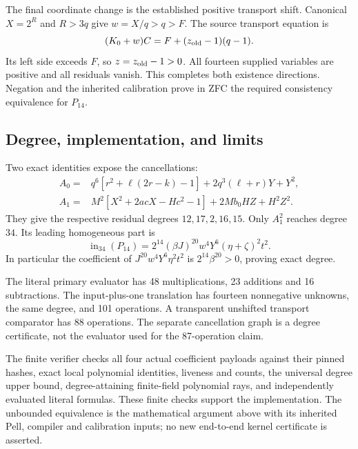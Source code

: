 The final coordinate change is the established positive transport shift.
Canonical $X=2^R$ and $R>3q$ give $w=X/q>q>F$. The source transport
equation is
\[
 (K_0+w)C=F+(z_{\rm old}-1)(q-1).
\]
Its left side exceeds $F$, so $z=z_{\rm old}-1>0$.
All fourteen supplied variables are positive and all residuals vanish.
This completes both existence directions. Negation and the inherited
calibration prove in ZFC the required consistency equivalence for $P_{14}$.

\subsection{Degree, implementation, and limits}

Two exact identities expose the cancellations:
\begin{align*}
 A_0={}&q^6[r^2+\ell(2r-k)-1]+2q^3(\ell+r)Y+Y^2,\\
 A_1={}&M^2[X^2+2acX-Hc^2-1]+2Mb_0HZ+H^2Z^2.
\end{align*}
They give the respective residual degrees $12,17,2,16,15$.
Only $A_1^2$ reaches degree $34$. Its leading homogeneous part is
\[
 \operatorname{in}_{34}(P_{14})
 =2^{14}(\beta J)^{20}w^4Y^6(\eta+\zeta)^2t^2.
\]
In particular the coefficient of $J^{20}w^4Y^6\eta^2t^2$ is
$2^{14}\beta^{20}>0$, proving exact degree.

The literal primary evaluator has 48 multiplications, 23 additions and 16
subtractions. The input-plus-one translation has fourteen nonnegative
unknowns, the same degree, and 101 operations. A transparent unshifted
transport comparator has 88 operations. The separate cancellation graph
is a degree certificate, not the evaluator used for the 87-operation claim.

The finite verifier checks all four actual coefficient payloads against
their pinned hashes, exact local polynomial identities, liveness and counts,
the universal degree upper bound, degree-attaining finite-field polynomial
rays, and independently evaluated literal formulas. These finite checks
support the implementation. The unbounded equivalence is the mathematical
argument above with its inherited Pell, compiler and calibration inputs;
no new end-to-end kernel certificate is asserted.
